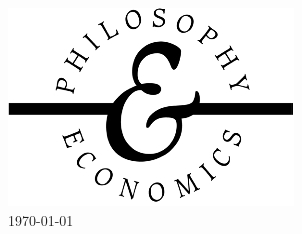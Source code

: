 \documentclass[12pt]{article}
\begin{document}
\begin{titlepage}




\includegraphics{./Graphics/logo}\\[1cm] %




{\large \today}%


 

\vfill %

\end{titlepage}

\end{document}
